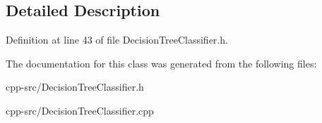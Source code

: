 \subsection{Detailed Description}


Definition at line 43 of file Decision\-Tree\-Classifier.\-h.



The documentation for this class was generated from the following files\-:\begin{DoxyCompactItemize}
\item 
cpp-\/src/Decision\-Tree\-Classifier.\-h\item 
cpp-\/src/Decision\-Tree\-Classifier.\-cpp\end{DoxyCompactItemize}
